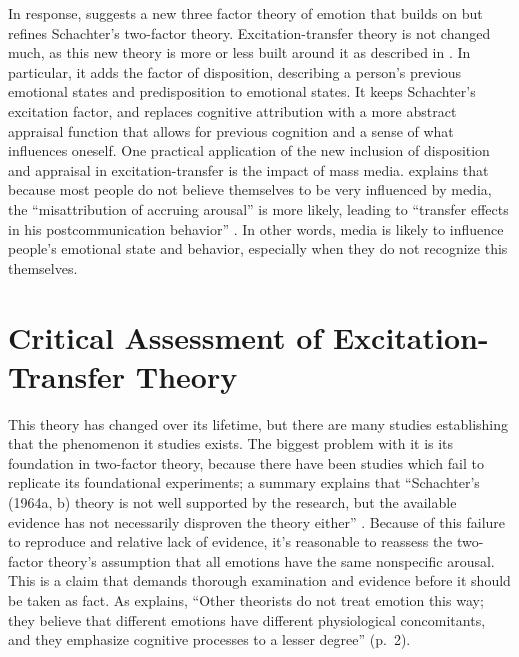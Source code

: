 \documentclass[
  stu,
  12pt]{apa7}
\begin{document}
In response, \textcite{tanEmotionalArousalFacilitation} suggests a new
three factor theory of emotion that builds on but refines Schachter's
two-factor theory. Excitation-transfer theory is not changed much, as
this new theory is more or less built around it as described in
\textcite{canEnhancementExperiencedSexual}. In particular, it adds the
factor of disposition, describing a person's previous emotional states
and predisposition to emotional states. It keeps Schachter's excitation
factor, and replaces cognitive attribution with a more abstract
appraisal function that allows for previous cognition and a sense of
what influences oneself. One practical application of the new inclusion
of disposition and appraisal in excitation-transfer is the impact of
mass media. \textcite{tanEmotionalArousalFacilitation} explains that
because most people do not believe themselves to be very influenced by
media, the ``misattribution of accruing arousal'' is more likely,
leading to ``transfer effects in his postcommunication behavior''
\autocite[ 187]{tanEmotionalArousalFacilitation}. In other words, media
is likely to influence people's emotional state and behavior, especially
when they do not recognize this themselves.

\hypertarget{critical-assessment-of-excitation-transfer-theory}{%
\section{Critical Assessment of Excitation-Transfer
Theory}\label{critical-assessment-of-excitation-transfer-theory}}

This theory has changed over its lifetime, but there are many studies
establishing that the phenomenon it studies exists. The biggest problem
with it is its foundation in two-factor theory, because there have been
studies which fail to replicate its foundational experiments; a summary
explains that ``Schachter's (1964a, b) theory is not well supported by
the research, but the available evidence has not necessarily disproven
the theory either'' \autocite[ 1]{cotReviewResearchSchachter}. Because
of this failure to reproduce and relative lack of evidence, it's
reasonable to reassess the two-factor theory's assumption that all
emotions have the same nonspecific arousal. This is a claim that demands
thorough examination and evidence before it should be taken as fact. As
\textcite{cotReviewResearchSchachter} explains, ``Other theorists do not
treat emotion this way; they believe that different emotions have
different physiological concomitants, and they emphasize cognitive
processes to a lesser degree'' (p.~2).
\end{document}
